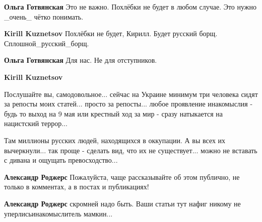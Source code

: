 \begin{itemize}
\begin{itemize}
\textbf{Ольга Готвянская} Это не важно. Похлёбки не будет в любом случае. Это нужно \_очень\_ чётко понимать.

 
\textbf{Kirill Kuznetsov} Похлёбки не будет, Кирилл. Будет русский борщ. Сплошной\_русский\_борщ.

 
\textbf{Ольга Готвянская} Для нас. Не для отступников.

 

\textbf{Kirill Kuznetsov} 

Послушайте вы, самодовольное... сейчас на Украине минимум три человека сидят за
репосты моих статей... просто за репосты... любое проявление инакомыслия - будь
то выход на 9 мая или крестный ход за мир - сразу натыкается на нацистский
террор...

Там миллионы русских людей, находящихся в оккупации. А вы всех их вычеркнули...
так проще - сделать вид, что их не существует... можно не вставать с дивана и
ощущать превосходство...


 
\textbf{Александр Роджерс} Пожалуйста, чаще рассказывайте об этом публично, не только в комментах, а в постах и публикациях!

 
\textbf{Александр Роджерс} скромней надо быть. Ваши статьи тут нафиг никому не уперлись\Laughey[1.0][white] инакомыслитель мамкин...
\end{itemize}


\end{itemize}
